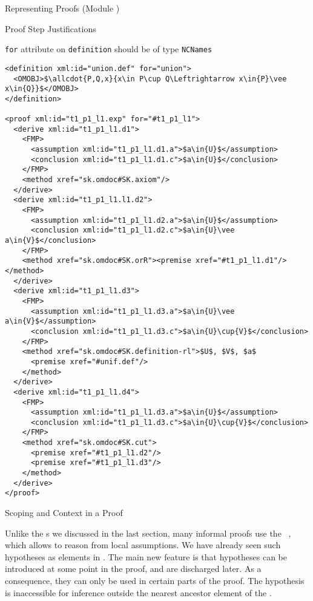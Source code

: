 \begin{tchapter}[id=proofs,short=Representing Proofs]{Representing Proofs (Module {})}
\begin{tsection}[id=proofs:justifications]{Proof Step Justifications}
\begin{erratum}[reported-by=Michael Kohlhase,date=2009-08-11]{{\texttt{for}} attribute on
    {\texttt{definition}} should be of type {\texttt{NCNames}}}
\begin{lstlisting}[label=lst:expansion2,mathescape,
  caption={An External Expansion of Step {\snippet{t\_1\_p1\_l1}} in {\mylstref{expansion}}},
  index={proof,derive,method,assumption,conclusion}]
<definition xml:id="union.def" for="union">
  <OMOBJ>$\allcdot{P,Q,x}{x\in P\cup Q\Leftrightarrow x\in{P}\vee x\in{Q}}$</OMOBJ>
</definition>

<proof xml:id="t1_p1_l1.exp" for="#t1_p1_l1">
  <derive xml:id="t1_p1_l1.d1">
    <FMP>
      <assumption xml:id="t1_p1_l1.d1.a">$a\in{U}$</assumption>
      <conclusion xml:id="t1_p1_l1.d1.c">$a\in{U}$</conclusion>
    </FMP>
    <method xref="sk.omdoc#SK.axiom"/>
  </derive>
  <derive xml:id="t1_p1_l1.l1.d2">
    <FMP>
      <assumption xml:id="t1_p1_l1.d2.a">$a\in{U}$</assumption>
      <conclusion xml:id="t1_p1_l1.d2.c">$a\in{U}\vee a\in{V}$</conclusion>
    </FMP>
    <method xref="sk.omdoc#SK.orR"><premise xref="#t1_p1_l1.d1"/></method>
  </derive>
  <derive xml:id="t1_p1_l1.d3">
    <FMP>
      <assumption xml:id="t1_p1_l1.d3.a">$a\in{U}\vee a\in{V}$</assumption>
      <conclusion xml:id="t1_p1_l1.d3.c">$a\in{U}\cup{V}$</conclusion>
    </FMP>
    <method xref="sk.omdoc#SK.definition-rl">$U$, $V$, $a$
      <premise xref="#unif.def"/>
    </method>
  </derive>
  <derive xml:id="t1_p1_l1.d4">
    <FMP>
      <assumption xml:id="t1_p1_l1.d3.a">$a\in{U}$</assumption>
      <conclusion xml:id="t1_p1_l1.d3.c">$a\in{U}\cup{V}$</conclusion>
    </FMP>
    <method xref="sk.omdoc#SK.cut">
      <premise xref="#t1_p1_l1.d2"/>
      <premise xref="#t1_p1_l1.d3"/>
    </method>
  </derive>
</proof>          
\end{lstlisting}
\end{erratum}
\end{tsection}

\begin{tsection}[id=proofs:scoping]{Scoping and Context in a Proof}
  
  Unlike the {s} we discussed in the last section, many
  informal proofs use the
  {}~\cite{Gentzen:uudlsiii35},
  which allows to reason from local assumptions. We have already seen such hypotheses as
  {} elements in {}. The main new feature
  is that hypotheses can be introduced at some point in the proof, and are discharged
  later.  As a consequence, they can only be used in certain parts of the proof.  The
  hypothesis is inaccessible for inference outside the nearest ancestor {}
  element of the {}.
  

\end{tsection}
\end{tchapter}
